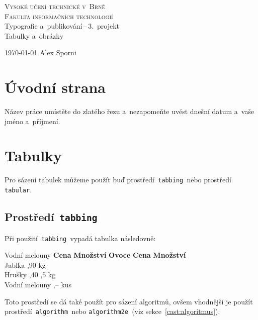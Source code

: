 \documentclass[a4paper, 11 pt]{article}
\begin{document}
\begin{titlepage}
		\begin{center}
			\Huge
			\textsc{Vysoké učení technické v~Brně} \\
			\huge
			\textsc{Fakulta informačních technologií} \\
			\LARGE
			Typografie a~publikování\,--\,3.~projekt \\
			\Huge
			Tabulky a~obrázky
		\end{center}

		{\Large
			\today
			\hfill
			Alex Sporni
		}
	\end{titlepage}

\section{Úvodní strana}
Název práce umístěte do zlatého řezu a~nezapomeňte uvést dnešní datum a~vaše jméno a~příjmení.

\section{Tabulky}
Pro sázení tabulek můžeme použít buď prostředí\texttt{ tabbing }nebo prostředí\texttt{ tabular}.

\subsection{Prostředí\texttt{ tabbing}}
Při použití\texttt{ tabbing }vypadá tabulka následovně:
\begin{tabbing}
Vodní melouny \quad	\= \textbf{Cena} \quad	\= \textbf{Množství}	\kill
		\textbf{Ovoce}		\> \textbf{Cena}		\> \textbf{Množství}	\\
		Jablka				,90				 kg					\\
		Hrušky				,40				,5 kg				\\
		Vodní melouny		,--				 kus				\\
\end{tabbing}
Toto prostředí se dá také použít pro sázení algoritmů, ovšem vhodnější je použít prostředí\texttt{ algorithm }nebo \texttt{algorithm2e }(viz sekce~\ref{cast:algoritmus}).
\end{document}

